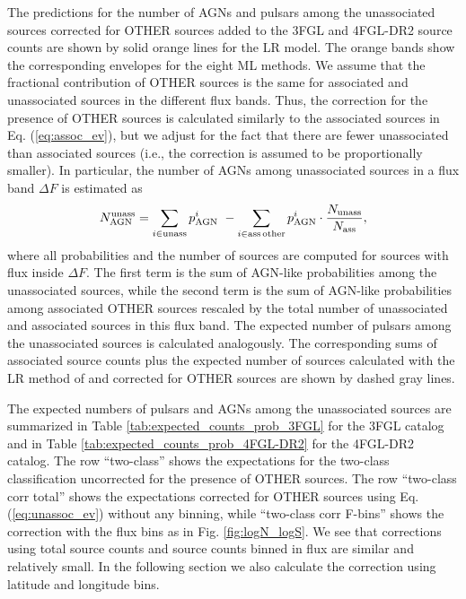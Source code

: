 \documentclass[referee]{aa} %
\newcommand{\bea}{\begin{eqnarray}}
\newcommand{\eea}{\end{eqnarray}}
\newcommand{\lb}{\label}
\begin{document}
The predictions for the number of AGNs and pulsars among the unassociated sources corrected for OTHER sources 
added to the 3FGL and 4FGL-DR2  source counts are shown by solid orange lines for the LR model.
The orange bands show the corresponding envelopes for the eight ML methods.
We assume that the fractional contribution of OTHER sources is the same for associated and unassociated sources in the different flux bands.
Thus, the correction for the presence of OTHER sources is calculated similarly to the associated sources in Eq. (\ref{eq:assoc_ev}),
but we adjust for the fact that there are fewer unassociated than associated sources (i.e., 
the correction is assumed to be proportionally smaller).
In particular, the number of AGNs among unassociated sources in a flux band $\Delta F$ is estimated as
\bea
\lb{eq:unassoc_ev}
N_{\rm AGN}^{\rm unass} = \sum_{i \in \rm unass} p^i_{\rm AGN}\,\, - \sum_{i \in \rm ass\,other} p^i_{\rm AGN} \cdot 
\frac{N_{\rm unass}}{N_{\rm ass}}
,\eea
where all probabilities and the number of sources are computed for sources with flux inside $\Delta F$.
The first term is the sum of AGN-like probabilities among the unassociated sources,
while the second term is the sum of AGN-like probabilities among associated OTHER sources rescaled by the total number
of unassociated and associated sources in this flux band.
The expected number of pulsars among the unassociated sources is calculated analogously.
The corresponding sums of associated source counts plus the expected number of sources calculated with the LR method of \cite{2016ApJ...820....8S} 
and corrected for OTHER sources are shown by dashed gray lines.


The expected numbers of pulsars and AGNs among the unassociated sources
are summarized in Table \ref{tab:expected_counts_prob_3FGL} for the 3FGL catalog and 
in Table \ref{tab:expected_counts_prob_4FGL-DR2} for the 4FGL-DR2 catalog.
The row ``two-class'' shows the expectations for the two-class classification uncorrected for the presence of OTHER sources.
The row ``two-class corr total'' shows the expectations corrected for OTHER sources using Eq. (\ref{eq:unassoc_ev}) without any binning,
while ``two-class corr F-bins'' shows the correction with the flux bins as in Fig. \ref{fig:logN_logS}.
We see that corrections using total source counts and source counts binned in flux are similar and relatively small.
In the following section we also calculate the correction using latitude and longitude bins.
\end{document}
